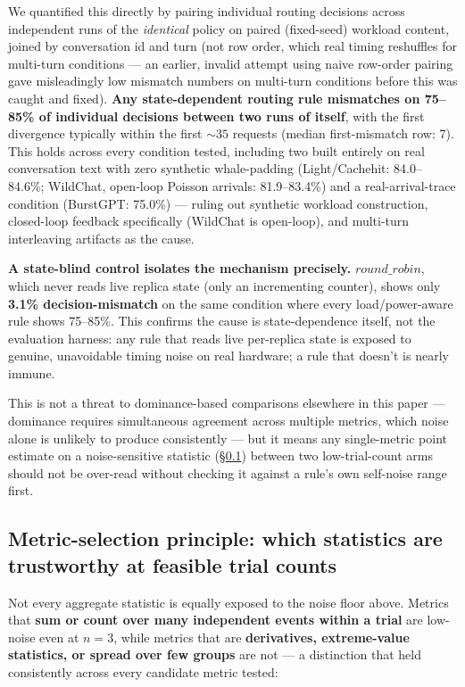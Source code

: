 \documentclass[sigconf,review,anonymous]{acmart}
\begin{document}
We quantified this directly by pairing individual routing decisions across independent runs
of the \emph{identical} policy on paired (fixed-seed) workload content, joined by conversation
id and turn (not row order, which real timing reshuffles for multi-turn conditions --- an
earlier, invalid attempt using naive row-order pairing gave misleadingly low mismatch numbers
on multi-turn conditions before this was caught and fixed). \textbf{Any state-dependent
routing rule mismatches on 75--85\% of individual decisions between two runs of itself}, with
the first divergence typically within the first ${\sim}35$ requests (median first-mismatch
row: 7). This holds across every condition tested, including two built entirely on real
conversation text with zero synthetic whale-padding (Light/Cachehit: 84.0--84.6\%; WildChat,
open-loop Poisson arrivals: 81.9--83.4\%) and a real-arrival-trace condition (BurstGPT:
75.0\%) --- ruling out synthetic workload construction, closed-loop feedback specifically
(WildChat is open-loop), and multi-turn interleaving artifacts as the cause.

\textbf{A state-blind control isolates the mechanism precisely.} $\mathit{round\_robin}$,
which never reads live replica state (only an incrementing counter), shows only
\textbf{3.1\% decision-mismatch} on the same condition where every load/power-aware rule
shows 75--85\%. This confirms the cause is state-dependence itself, not the evaluation
harness: any rule that reads live per-replica state is exposed to genuine, unavoidable timing
noise on real hardware; a rule that doesn't is nearly immune.

This is not a threat to dominance-based comparisons elsewhere in this paper --- dominance
requires simultaneous agreement across multiple metrics, which noise alone is unlikely to
produce consistently --- but it means any single-metric point estimate on a noise-sensitive
statistic (\S\ref{sec:metricselection}) between two low-trial-count arms should not be
over-read without checking it against a rule's own self-noise range first.

\subsection{Metric-selection principle: which statistics are trustworthy at feasible trial counts}
\label{sec:metricselection}

Not every aggregate statistic is equally exposed to the noise floor above. Metrics that
\textbf{sum or count over many independent events within a trial} are low-noise even at
$n{=}3$, while metrics that are \textbf{derivatives, extreme-value statistics, or spread over
few groups} are not --- a distinction that held consistently across every candidate metric
tested:
\end{document}
